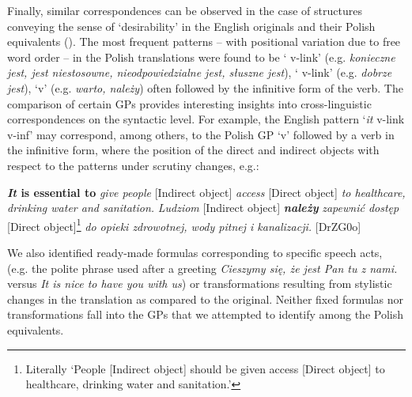 \documentclass[output=paper]{langscibook}
\begin{document}
Finally, similar correspondences can be observed in the case of structures conveying the sense of ‘desirability’ in the English originals and their Polish equivalents (). The most frequent patterns -- with positional variation due to free word order -- in the Polish translations were found to be ‘{\ADJ} v-link’ (e.g. \textit{konieczne jest, jest niestosowne, nieodpowiedzialne jest, słuszne jest}), ‘{\ADV} v-link’ (e.g. \textit{dobrze jest}), ‘{\MOD}v’ (e.g. \textit{warto, należy}) often followed by the infinitive form of the verb. The comparison of certain GPs provides interesting insights into cross-linguistic correspondences on the syntactic level. For example, the English pattern ‘\textit{it} v-link {\ADJ} v-inf’ may correspond, among others, to the Polish GP ‘{\MOD}v’ followed by a verb in the infinitive form, where the position of the direct and indirect objects with respect to the patterns under scrutiny changes, e.g.: 


\ea
\ea \textbf{\textit{It} \textbf{is} \textbf{essential} \textbf{to}} \textit{give people} [Indirect object] \textit{access} [Direct object] \textit{to healthcare, drinking water and sanitation.} 
\ex\textit{Ludziom} [Indirect object] \textbf{\textit{należy}} \textit{zapewnić dostęp} [Direct object]\footnote{\textrm{Literally ‘People [Indirect object] should be given access [Direct object] to healthcare, drinking water and sanitation.’}} \textit{do opieki zdrowotnej, wody pitnej i kanalizacji.} [DrZG0o]
\z
\z

\clearpage
We also identified ready-made formulas corresponding to specific speech acts, (e.g. the polite phrase used after a greeting \textit{Cieszymy się, że jest Pan tu z nami.} versus \textit{It is nice to have you with us}) or transformations resulting from stylistic changes in the translation as compared to the original. Neither fixed formulas nor transformations  fall into the GPs that we attempted to identify among the Polish equivalents.
\end{document}
